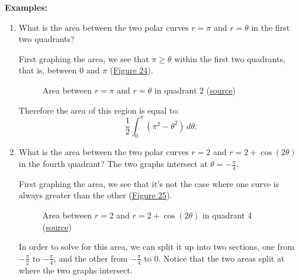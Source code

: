 \documentclass[12pt]{article}
\begin{document}
\noindent \textbf{Examples:}
\begin{enumerate}
    \item What is the area between the two polar curves $r=\pi$ and $r=\theta$ in the first two quadrants?

          First graphing the area, we see that $\pi \ge \theta$ within the first two quadrants, that is, between $0$ and $\pi$ (\hyperref[fig:abpc1]{Figure 24}).

          \begin{figure}[H]
              \begin{center}
                  \caption{Area between $r=\pi$ and $r=\theta$ in quadrant 2 (\href{https://www.khanacademy.org/math/ap-calculus-bc/bc-advanced-functions-new/bc-9-9/e/area-between-two-polar-curves?modal=1}{source})}
                  \label{fig:abpc1}
              \end{center}
          \end{figure}

          Therefore the area of this region is equal to:
          \[ \frac{1}{2} \int_0^\pi \left( \pi^2 - \theta^2 \right) \, d\theta. \]
          \bigskip

    \item What is the area between the two polar curves $r=2$ and $r=2+\cos(2\theta)$ in the fourth quadrant? The two graphs intersect at $\theta = -\frac{\pi}{4}$.

          First graphing the area, we see that it's not the case where one curve is always greater than the other (\hyperref[fig:abpc2]{Figure 25}).

          \begin{figure}[H]
              \begin{center}
                  \caption{Area between $r=2$ and $r=2+\cos(2\theta)$ in quadrant 4 (\href{https://www.khanacademy.org/math/ap-calculus-bc/bc-advanced-functions-new/bc-9-9/e/area-between-two-polar-curves?modal=1}{source})}
                  \label{fig:abpc2}
              \end{center}
          \end{figure}

          In order to solve for this area, we can split it up into two sections, one from $-\frac{\pi}{2}$ to $-\frac{\pi}{4}$, and the other from $-\frac{\pi}{4}$ to $0$. Notice that the two areas split at where the two graphs intersect.


\end{enumerate}
\end{document}
